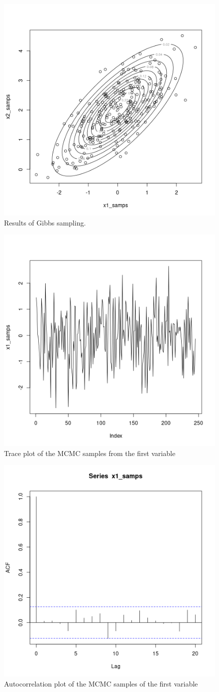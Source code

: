 \begin{figure}
     \centering
     \includegraphics[width=.50\textwidth]{../code/q2/plots/gibbs_samples.png}
     \caption{Results of Gibbs sampling.}
     \label{fig:gibbs_samples}
\end{figure}
\begin{figure}
     \centering
     \includegraphics[width=.50\textwidth]{../code/q2/plots/x1_trace_plot.png}
     \caption{Trace plot of the MCMC samples from the first variable}
     \label{fig:x1_trace}
\end{figure}
\begin{figure}
     \centering
     \includegraphics[width=.50\textwidth]{../code/q2/plots/x1_lag1_autocorr.png}
     \caption{Autocorrelation plot of the MCMC samples of the first variable}
     \label{fig:x1_autocorr}
\end{figure}
